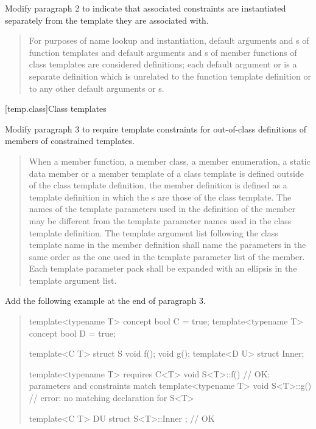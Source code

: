 Modify paragraph 2 to indicate that associated constraints are
instantiated separately from the template they are associated with.

\begin{quote}
\setcounter{Paras}{1}
For purposes of name lookup and instantiation, default 
arguments and
s of function templates and default
arguments and 
s of member functions of class
templates are considered definitions; each default 
argument or 
 is a separate definition which is 
unrelated to the function template definition or to any other default 
arguments or 
s.
\end{quote}


[temp.class]{Class templates}

Modify paragraph 3 to require template constraints for out-of-class
definitions of members of constrained templates. 

\begin{quote}
\setcounter{Paras}{2}
\pnum
When a member function, a member class, a member enumeration, a static 
data member or a member template of a class template is defined outside 
of the class template definition, the member definition is defined as a 
template definition in which the s
 are those of the class template.
% 
The names of the template parameters used in the definition of the 
member may be different from the template parameter names used in the 
class template definition. The template argument list following the class
template name in the member definition shall name the parameters in the 
same order as the one used in the template parameter list of the member. 
% 
Each template parameter pack shall be expanded with an ellipsis in the 
template argument list.
\end{quote}

Add the following example at the end of paragraph 3.

\begin{quote}
\begin{addedblock}
\enterexample
\begin{codeblock}
template<typename T> concept bool C = true;
template<typename T> concept bool D = true;

template<C T> struct S {
    void f();
    void g();
    template<D U> struct Inner;
  }

template<typename T> requires C<T> void S<T>::f() { } // OK: parameters and constraints match
template<typename T> void S<T>::g() { } // error: no matching declaration for S<T>

template<C T> D{U} struct S<T>::Inner { }; // OK
\end{codeblock}
\exitexample
\end{addedblock}
\end{quote}

